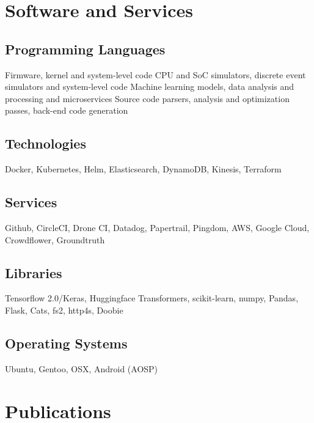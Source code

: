 \documentclass[11pt,a4paper,sans]{moderncv}
\begin{document}

\section{Software and Services}
\subsection{Programming Languages}
 {\small
Firmware, kernel and system-level code
}
 {\small
CPU and SoC simulators, discrete event simulators and system-level code
}
 {\small
Machine learning models, data analysis and processing and microservices
}
 {\small
Source code parsers, analysis and optimization passes, back-end code generation
}

\subsection{Technologies}
\cvitem{} {\small
Docker, Kubernetes, Helm, Elasticsearch, DynamoDB, Kinesis, Terraform
}

\subsection{Services}
\cvitem{} {\small
Github, CircleCI, Drone CI, Datadog, Papertrail, Pingdom, AWS, Google Cloud, Crowdflower, Groundtruth
}

\subsection{Libraries}
\cvitem{} {\small
Tensorflow 2.0/Keras, Huggingface Transformers, scikit-learn, numpy, Pandas, Flask, Cats, fs2, http4s, Doobie
}

\subsection{Operating Systems}
\cvitem{} {\small
Ubuntu, Gentoo, OSX, Android (AOSP)
}

\section{Publications}
\end{document}
